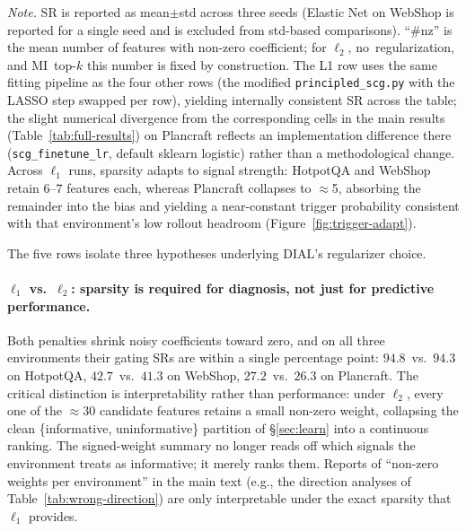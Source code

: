 \noindent\textit{Note.} SR is reported as mean$\pm$std across three
seeds (Elastic Net on WebShop is reported for a single seed and
is excluded from std-based comparisons).
``\#nz'' is the mean number of features with non-zero coefficient;
for $\ell_2$, no~regularization, and MI~top-$k$ this number is
fixed by construction. The L1 row uses the same fitting pipeline
as the four other rows (the modified \texttt{principled\_scg.py}
with the LASSO step swapped per row), yielding internally
consistent SR across the table; the slight numerical
divergence from the corresponding cells in the main results
(Table~\ref{tab:full-results}) on Plancraft reflects an
implementation difference there
(\texttt{scg\_finetune\_lr}, default sklearn logistic) rather than
a methodological change. Across $\ell_1$ runs, sparsity adapts to
signal strength: HotpotQA and WebShop retain $6$--$7$ features
each, whereas Plancraft collapses to $\approx$5, absorbing the
remainder into the bias and yielding a near-constant trigger
probability consistent with that environment's low rollout
headroom (Figure~\ref{fig:trigger-adapt}).

The five rows isolate three hypotheses underlying DIAL's
regularizer choice.

\paragraph{$\ell_1$ vs.\ $\ell_2$: sparsity is required for
diagnosis, not just for predictive performance.}
Both penalties shrink noisy coefficients toward zero, and on
all three environments their gating SRs are within a single
percentage point: $94.8$~vs.\ $94.3$ on HotpotQA,
$42.7$~vs.\ $41.3$ on WebShop, $27.2$~vs.\ $26.3$ on Plancraft.
The critical distinction is interpretability rather than
performance: under $\ell_2$, every one of the $\approx$30
candidate features retains a small non-zero weight, collapsing
the clean \{informative, uninformative\} partition of
\S\ref{sec:learn} into a continuous ranking. The signed-weight
summary no longer reads off which signals the environment treats
as informative; it merely ranks them. Reports of ``non-zero
weights per environment'' in the main text (e.g., the direction
analyses of Table~\ref{tab:wrong-direction}) are only
interpretable under the exact sparsity that $\ell_1$ provides.

